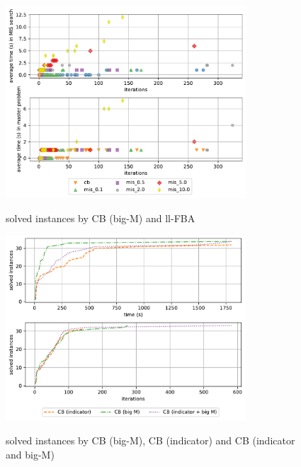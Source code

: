\begin{figure}[h!]
    \caption{solved instances by CB (big-M) and ll-FBA}
    \centering
    \includegraphics[width=0.8\textwidth]{Images/mis_comparison_time_vs_iterations_big_m.pdf}
    \label{fig:mis_comparison_time_vs_iterations_big_m}
\end{figure}

\begin{figure}[h!]
    \caption{solved instances by CB (big-M), CB (indicator) and CB (indicator and big-M)}
    \centering
    \includegraphics[width=0.8\textwidth]{Images/comparison_solved_instances_indicator_and_big_m.pdf}
    \label{fig:comparison_solved_instances_indicator_and_big_m_as_MP}
\end{figure}


